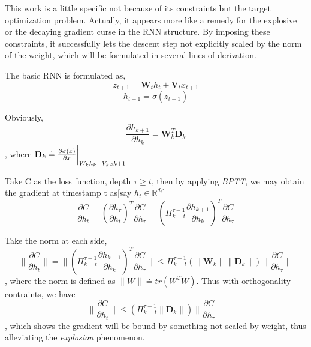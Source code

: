 \documentclass[10pt,a4paper]{article}
\begin{document}
This work is a little specific not because of its constraints but the target optimization problem. Actually, it appears more like a remedy for the explosive or the decaying gradient curse in the RNN structure. By imposing these constraints, it successfully lets the descent step not explicitly scaled by the norm of the weight, which will be formulated in several lines of derivation.

The basic RNN is formulated as,
$$
	z_{t+1} = \mathbf{W}_t{h_t}+\mathbf{V}_t{x_{t+1}}
$$
$$
	h_{t+1} = \sigma(z_{t+1})
$$

Obviously, 
$$
	\frac{\partial{h_{k+1}}}{\partial{h_{k}}} = \mathbf{W}_k^T\mathbf{D}_k
$$
, where $\mathbf{D}_k \doteq{\frac{\partial{\sigma(x)}}{\partial{x}}\bigg{|}_{W_kh_k+V_kx{k+1}}}$



Take C as the loss function, depth $\tau\geq{t}$, then by applying \textit{BPTT}, we may obtain the gradient at timestamp t as[say $h_t\in\mathbb{R}^{d_t}$]
$$
	\frac{\partial{C}}{\partial{h_t}} = (\frac{\partial{h_\tau}}{\partial{h_t}})^{T}\frac{\partial{C}}{\partial{h_\tau}}= (\Pi_{k=t}^{\tau-1}\frac{\partial{h_{k+1}}}{\partial{h_k}})^{T}\frac{\partial{C}}{\partial{h_\tau}}
$$ 

Take the norm at each side,
$$
	\|\frac{\partial{C}}{\partial{h_t}}\| = \|(\Pi_{k=t}^{\tau-1}\frac{\partial{h_{k+1}}}{\partial{h_k}})^{T}\frac{\partial{C}}{\partial{h_\tau}}\|
	\leq\Pi_{k=t}^{\tau-1}(\|\mathbf{W}_k\|\|\mathbf{D}_k\|)\|\frac{\partial{C}}{\partial{h_\tau}}\|
$$
, where the norm is defined as $\|W\| \doteq tr(W^TW)$. Thus with orthogonality contraints, we have
$$
   \|\frac{\partial{C}}{\partial{h_t}}\|\leq(\Pi_{k=t}^{\tau-1}\|\mathbf{D}_k\|)\|\frac{\partial{C}}{\partial{h_\tau}}\|
$$
, which shows the gradient will be bound by something not scaled by weight, thus alleviating the \textit{explosion} phenomenon.
\end{document}
